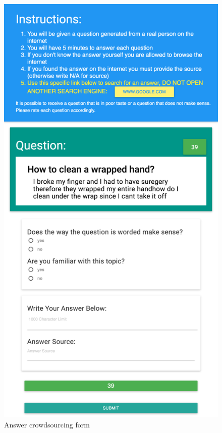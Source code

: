 \documentclass[11pt,letterpaper]{article}
\begin{document}
\begin{figure}[h!]
\centering
\includegraphics[width=0.9\linewidth]{img/answering_screenshot2}
\caption{Answer crowdsourcing form}
\label{fig:interfaces:answer}
\end{figure}



\end{document}
